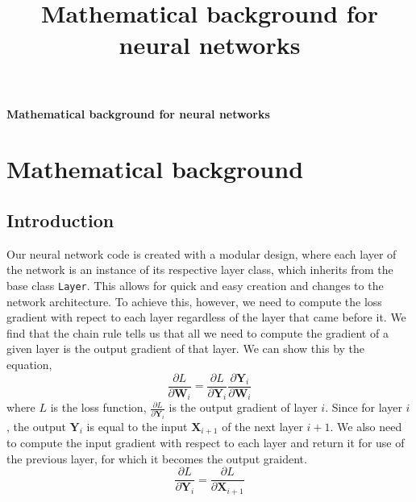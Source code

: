\documentclass[11pt]{article}
\theoremstyle{definition}
\begin{document}
\title{Mathematical background for neural networks}

\thispagestyle{empty}

\begin{center}
{\LARGE \bf Mathematical background for neural networks}\\
\end{center}

\section{Mathematical background}
\subsection{Introduction}
Our neural network code is created with a modular design, where each layer of the 
network is an instance of its respective layer class, which inherits from the base 
class \texttt{Layer}. This allows for quick and easy creation and changes to the 
network architecture. To achieve this, however, we need to compute the loss gradient 
with repect to each layer regardless of the layer that came before it. We find that the 
chain rule tells us that all we need to compute the gradient of a given layer is the 
output gradient of that layer.
We can show this by the equation,
\begin{equation}
    \frac{\partial L}{\partial \mathbf{W}_i} = \frac{\partial L}{\partial \mathbf{Y}_i} \frac{\partial \mathbf{Y}_i}{\partial \mathbf{W}_i}
\end{equation}
where $L$ is the loss function, $\frac{\partial L}{\partial \mathbf{Y}_i}$ is the output 
gradient of layer $i$.
Since for layer $i$, the output $\mathbf{Y}_i$ is equal to the input $\mathbf{X}_{i+1}$ 
of the next layer $i+1$.
We also need to compute the input gradient with respect to each layer and return it for 
use of the previous layer, for which it becomes the output graident. 
\begin{equation}
    \frac{\partial L}{\partial \mathbf{Y}_i} = \frac{\partial L}{\partial \mathbf{X}_{i+1}} 
\end{equation}
\end{document}
